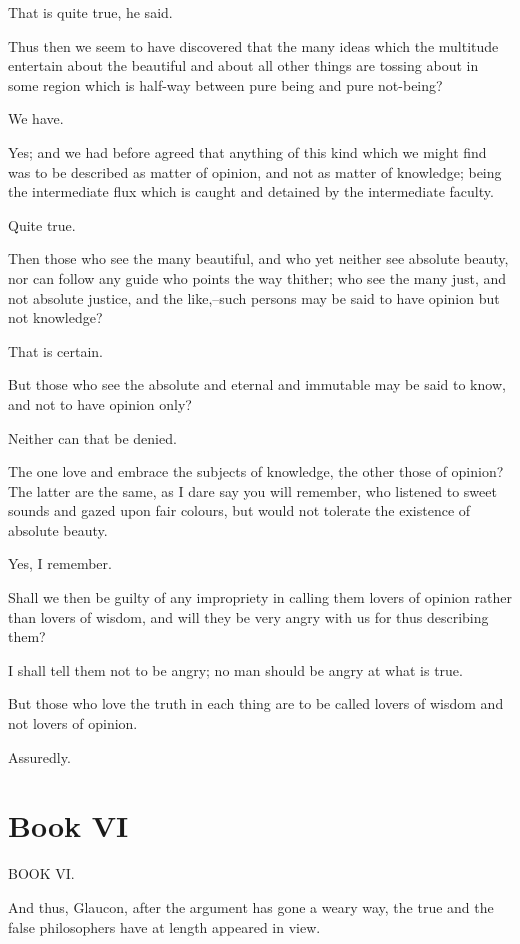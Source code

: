 That is quite true, he said.

Thus then we seem to have discovered that the many ideas which the
multitude entertain about the beautiful and about all other things are
tossing about in some region which is half-way between pure being and
pure not-being?

We have.

Yes; and we had before agreed that anything of this kind which we might
find was to be described as matter of opinion, and not as matter of
knowledge; being the intermediate flux which is caught and detained by
the intermediate faculty.

Quite true.

Then those who see the many beautiful, and who yet neither see absolute
beauty, nor can follow any guide who points the way thither; who see the
many just, and not absolute justice, and the like,--such persons may be
said to have opinion but not knowledge?

That is certain.

But those who see the absolute and eternal and immutable may be said to
know, and not to have opinion only?

Neither can that be denied.

The one love and embrace the subjects of knowledge, the other those of
opinion? The latter are the same, as I dare say you will remember, who
listened to sweet sounds and gazed upon fair colours, but would not
tolerate the existence of absolute beauty.

Yes, I remember.

Shall we then be guilty of any impropriety in calling them lovers of
opinion rather than lovers of wisdom, and will they be very angry with
us for thus describing them?

I shall tell them not to be angry; no man should be angry at what is
true.

But those who love the truth in each thing are to be called lovers of
wisdom and not lovers of opinion.

Assuredly.



\section{Book VI} %
\label{sec:book_vi}



BOOK VI.

And thus, Glaucon, after the argument has gone a weary way, the true and
the false philosophers have at length appeared in view.

